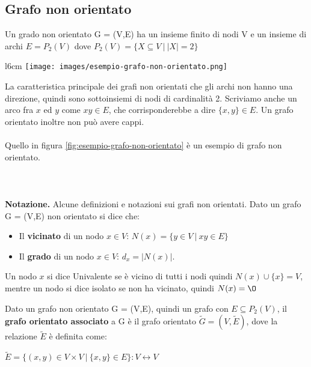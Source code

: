 \subsection{Grafo non orientato}
\begin{definition}
    Un grado non orientato G = (V,E) ha un insieme finito di nodi V e un insieme di archi $E = P_2(V)$ dove $P_2(V) = \{X \subseteq V \: | \: |X| = 2\}$
\end{definition}
\begin{wrapfigure}[8]{l}{6cm}
    \vspace{-15pt}
    \centering
    \texttt{[image: images/esempio-grafo-non-orientato.png]}
    \vspace{-5pt}
    \caption{Grafo G non oriento}
    \label{fig:esempio-grafo-non-orientato}
\end{wrapfigure}
La caratteristica principale dei grafi non orientati  che gli archi non hanno una direzione, quindi sono sottoinsiemi di nodi di cardinalità 2. Scriviamo anche un arco fra $x$ ed $y$ come $xy \in E$, che corrisponderebbe a dire  $\{x,y\} \in E$. Un grafo orientato inoltre non può avere cappi.\\ \\
Quello in figura \ref{fig:esempio-grafo-non-orientato} è un esempio di grafo non orientato. \\\\\\\\
\textbf{Notazione.} Alcune definizioni e notazioni sui grafi non orientati. Dato un grafo G = (V,E) non orientato si dice che:
\begin{itemize}
    \item Il \textbf{vicinato} di un nodo $x \in V$: \hspace{.7cm} $N(x) = \{y \in V \: | \: xy \in E\}$
    \item Il \textbf{grado} di un nodo $x \in V$: \hspace{.7cm} $d_x = |N(x)|$.
\end{itemize}
\begin{definition}
    Un nodo $x$ si dice Univalente se è vicino di tutti i nodi quindi $N(x) \cup \{x\} = V$, mentre un nodo si dice isolato se non ha vicinato, quindi $N(x) = \O$
\end{definition}

\begin{definition}
    Dato un grafo non orientato G = (V,E), quindi un grafo con $E \subseteq P_2(V)$, il \textbf{grafo orientato associato} a G è il grafo orientato $\widetilde{G} = (V, \widetilde{E})$, dove la relazione $\widetilde{E}$ è definita come:
    \begin{center}
        $\widetilde{E} = \{(x,y) \in V \times V \: | \: \{x,y\} \in E\}: V \leftrightarrow V$
    \end{center}
\end{definition}

